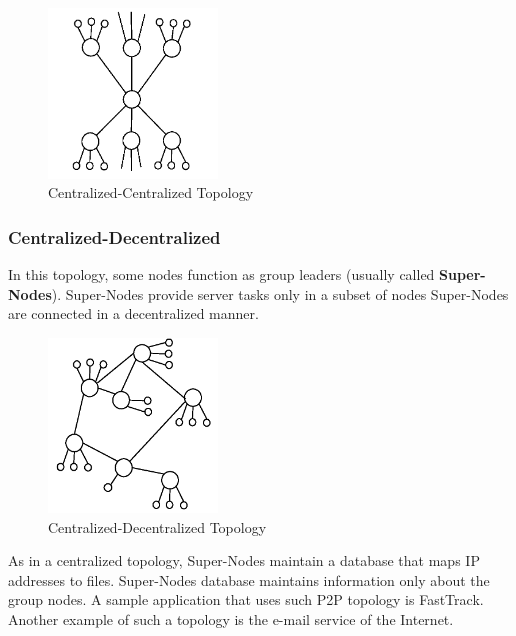 \begin{figure}
  \centering
  \includegraphics[width=0.4\textwidth]{src/img/p2p-systems/centralized-centralized}
  \caption{Centralized-Centralized Topology}
  \label{fig:p2p-systems:centralized-centralized}
\end{figure}

\subsubsection{Centralized-Decentralized}

In this topology, some nodes function as group leaders (usually called
\textbf{Super-Nodes}). Super-Nodes provide server tasks only in a subset of
nodes  Super-Nodes are connected in a decentralized manner.

\begin{figure}
  \centering
  \includegraphics[width=0.4\textwidth]{src/img/p2p-systems/centralized-decentralized}
  \caption{Centralized-Decentralized Topology}
  \label{fig:p2p-systems:centralized-decentralized}
\end{figure}

As in a centralized topology, Super-Nodes maintain a database that maps IP
addresses to files. Super-Nodes database maintains information only about
the group nodes. A sample application that uses such P2P topology is
FastTrack. Another example of such a topology is the e-mail
service of the Internet.

